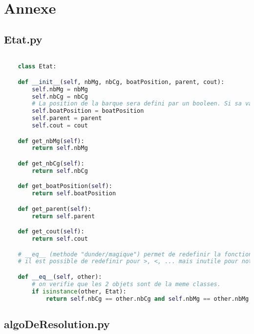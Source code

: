 \documentclass[a4paper, 12pt, french,oneside]{book}
\begin{document}
\appendix
\chapter{Annexe}
\section{Etat.py}
\begin{lstlisting}[language=Python, caption=Python example] 

    class Etat:

    def __init__(self, nbMg, nbCg, boatPosition, parent, cout):
        self.nbMg = nbMg
        self.nbCg = nbCg
        # La position de la barque sera defini par un booleen. Si sa valeur est egale a vraie alors la barque est a guache sinon elle est a droite
        self.boatPosition = boatPosition
        self.parent = parent
        self.cout = cout

    def get_nbMg(self):
        return self.nbMg

    def get_nbCg(self):
        return self.nbCg

    def get_boatPosition(self):
        return self.boatPosition

    def get_parent(self):
        return self.parent

    def get_cout(self):
        return self.cout

    # __eq__ (methode "dunder/magique") permet de redefinir la fonction ==. Cela nous sera utile pour verifie si 2 etats sont egaux. (fonctionne avec .remove() pour la comparaison d'etat)
    # il est possible de redefinir pour >, <, ... mais inutile pour notre cas.

    def __eq__(self, other):
        # on verifie que les 2 objets sont de la meme classes.
        if isinstance(other, Etat):
            return self.nbCg == other.nbCg and self.nbMg == other.nbMg and self.boatPosition == other.boatPosition
\end{lstlisting}

\section{algoDeResolution.py}
\end{document}
